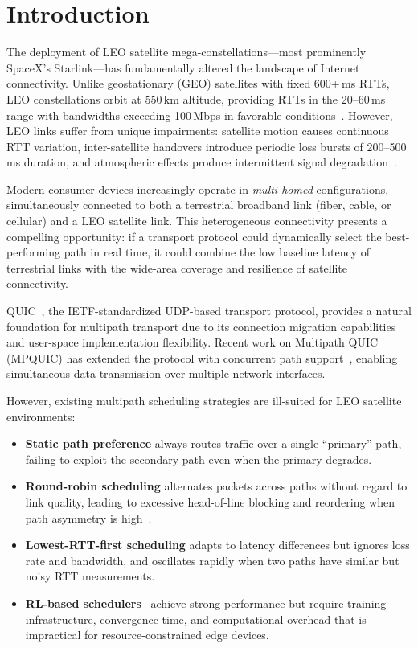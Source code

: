 \documentclass[conference,10pt]{IEEEtran}
\begin{document}
\section{Introduction}

The deployment of LEO satellite mega-constellations—most prominently SpaceX's Starlink—has fundamentally altered the landscape of Internet connectivity.
Unlike geostationary (GEO) satellites with fixed 600+\,ms RTTs, LEO constellations orbit at 550\,km altitude, providing RTTs in the 20--60\,ms range with bandwidths exceeding 100\,Mbps in favorable conditions~\cite{kassem2025starlink, mohan2026starlinkv2}.
However, LEO links suffer from unique impairments: satellite motion causes continuous RTT variation, inter-satellite handovers introduce periodic loss bursts of 200--500\,ms duration, and atmospheric effects produce intermittent signal degradation~\cite{han2025leo}.

Modern consumer devices increasingly operate in \emph{multi-homed} configurations, simultaneously connected to both a terrestrial broadband link (fiber, cable, or cellular) and a LEO satellite link.
This heterogeneous connectivity presents a compelling opportunity: if a transport protocol could dynamically select the best-performing path in real time, it could combine the low baseline latency of terrestrial links with the wide-area coverage and resilience of satellite connectivity.

QUIC~\cite{rfc9369}, the IETF-standardized UDP-based transport protocol, provides a natural foundation for multipath transport due to its connection migration capabilities and user-space implementation flexibility.
Recent work on Multipath QUIC (MPQUIC) has extended the protocol with concurrent path support~\cite{devaux2026mpquicv2}, enabling simultaneous data transmission over multiple network interfaces.

However, existing multipath scheduling strategies are ill-suited for LEO satellite environments:

\begin{itemize}
    \item \textbf{Static path preference} always routes traffic over a single ``primary'' path, failing to exploit the secondary path even when the primary degrades.
    \item \textbf{Round-robin scheduling} alternates packets across paths without regard to link quality, leading to excessive head-of-line blocking and reordering when path asymmetry is high~\cite{li2025mptcp}.
    \item \textbf{Lowest-RTT-first scheduling} adapts to latency differences but ignores loss rate and bandwidth, and oscillates rapidly when two paths have similar but noisy RTT measurements.
    \item \textbf{RL-based schedulers}~\cite{zheng2025mpquic} achieve strong performance but require training infrastructure, convergence time, and computational overhead that is impractical for resource-constrained edge devices.
\end{itemize}
\end{document}
